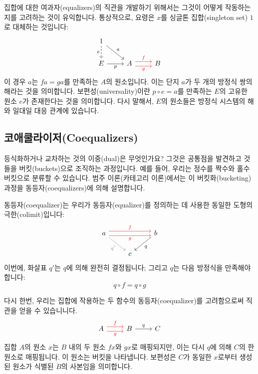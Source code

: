 \documentclass[DaoFP]{subfiles}
\begin{document}
집합에 대한 여과자(equalizers)의 직관을 개발하기 위해서는 그것이 어떻게 작동하는지를 고려하는 것이 유익합니다. 통상적으로, 요령은 $x$를 싱글톤 집합(singleton set) $1$로 대체하는 것입니다:
\[
\begin{tikzcd}
1
\arrow[d, dashed, "e"']
\arrow[dr, "a"]
\\
E
\arrow[r, "p"']
&
A \arrow[r, red, shift left=0.75ex, "f"]
  \arrow[r, red, shift right=0.75ex, "g"']
&
B
\end{tikzcd}
\]
이 경우 $a$는 $f a = g a$를 만족하는 $A$의 원소입니다. 이는 단지 $a$가 두 개의 방정식 쌍의 해라는 것을 의미합니다. 보편성(universality)이란 $p \circ e = a$를 만족하는 $E$의 고유한 원소 $e$가 존재한다는 것을 의미합니다. 다시 말해서, $E$의 원소들은 방정식 시스템의 해와 일대일 대응 관계에 있습니다.

\subsection{코애쿨라이저(Coequalizers)}

등식화하거나 교차하는 것의 이중(dual)은 무엇인가요? 그것은 공통점을 발견하고 것들을 버킷(buckets)으로 조직하는 과정입니다. 예를 들어, 우리는 정수를 짝수와 홀수 버킷으로 분류할 수 있습니다. 범주 이론(카테고리 이론)에서는 이 버킷화(bucketing) 과정을 동등자(coequalizers)에 의해 설명합니다.

동등자(coequalizer)는 우리가 동등자(equalizer)를 정의하는 데 사용한 동일한 도형의 극한(colimit)입니다:
\[
\begin{tikzcd}
a 
\arrow[rr, red, shift left=.75ex, "f"]
\arrow[rr, red, shift right=.75ex, "g"']
\arrow[rd, gray, "q'"']
&&
b
\arrow[ld, "q"]
\\
& c
\end{tikzcd}
\]
이번에, 화살표 $q'$는 $q$에 의해 완전히 결정됩니다; 그리고 $q$는 다음 방정식을 만족해야 합니다:
\[ q \circ f = q \circ g \]

다시 한번, 우리는 집합에 작용하는 두 함수의 동등자(coequalizer)를 고려함으로써 직관을 얻을 수 있습니니다.
\[
\begin{tikzcd}
A
\arrow[r, red, shift left=.75ex, "f"]
\arrow[r, red, shift right=.75ex, "g"']
&
B
\arrow[r, "q"]
& C
\end{tikzcd}
\]
집합 $A$의 원소 $x$는 $B$ 내의 두 원소 $f x$와 $g x$로 매핑되지만, 이는 다시 $q$에 의해 $C$의 한 원소로 매핑됩니다. 이 원소는 버킷을 나타냅니다. 보편성은 $C$가 동일한 $x$로부터 생성된 원소가 식별된 $B$의 사본임을 의미합니다.
\end{document}
